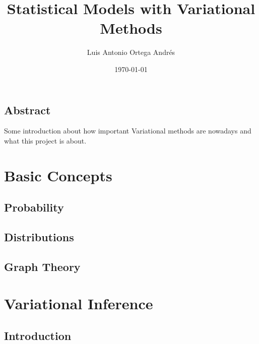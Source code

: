 \documentclass[twoside,openright,titlepage,numbers=noenddot,openany,headinclude,footinclude=true, cleardoublepage=empty,abstractoff,BCOR=5mm,paper=a4,fontsize=11pt]{scrreprt}
\author{Luis Antonio Ortega Andrés}
\date{\today}
\title{Statistical Models with Variational Methods}
\begin{document}
\maketitle

\chapter*{Abstract}

Some introduction about how important Variational methods are nowadays and what this project is about.

\tableofcontents

\part{Basic Concepts}

\chapter{Probability}



\chapter{Distributions}



\chapter{Graph Theory}




\ctparttext{
  \color{black}
  \begin{center}

  \end{center}
}
\part{Variational Inference}

\chapter{Introduction}
\end{document}
